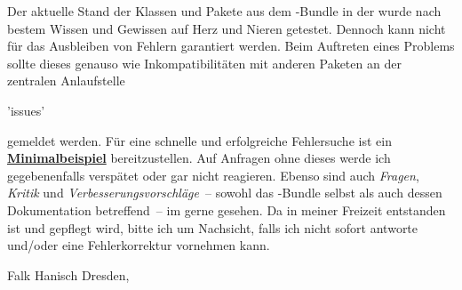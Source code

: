 Der aktuelle Stand der Klassen und Pakete aus dem \TUDScript-Bundle in der 
 wurde nach bestem Wissen und Gewissen auf Herz und Nieren 
getestet. Dennoch kann nicht für das Ausbleiben von Fehlern garantiert werden. 
Beim Auftreten eines Problems sollte dieses genauso wie Inkompatibilitäten mit 
anderen Paketen an der zentralen Anlaufstelle
\begin{quoting}
\renewcommand*\href[2]{\url{#1}\quad(#2)}
\GitHubRepo'issues'%
\end{quoting}
gemeldet werden. Für eine schnelle und erfolgreiche Fehlersuche ist ein 
\href{http://www.komascript.de/minimalbeispiel}{\textbf{Minimalbeispiel}} 
bereitzustellen. Auf Anfragen ohne dieses werde ich gegebenenfalls verspätet 
oder gar nicht reagieren. Ebenso sind auch \emph{Fragen}, \emph{Kritik} und 
\emph{Verbesserungsvorschläge}~-- sowohl das \TUDScript-Bundle selbst als auch 
dessen Dokumentation betreffend~-- im \GitHubRepo gerne gesehen. Da \TUDScript 
in meiner Freizeit entstanden ist und gepflegt wird, bitte ich um Nachsicht, 
falls ich nicht sofort antworte und/oder eine Fehlerkorrektur vornehmen kann.

\bigskip
\noindent Falk Hanisch\newline
Dresden, 
